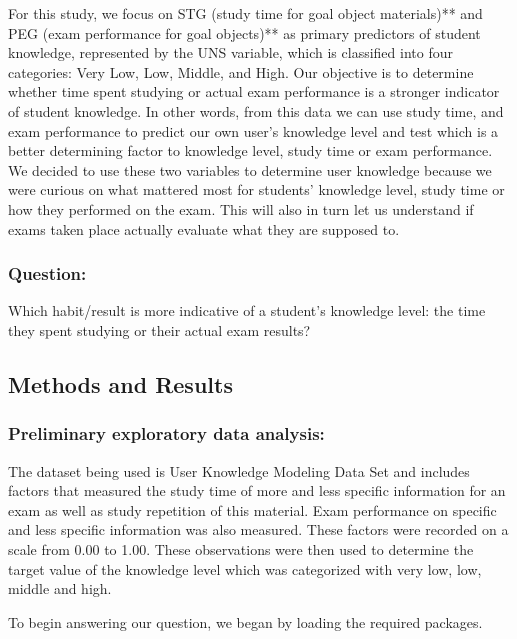 \documentclass[
  letterpaper,
  DIV=11,
  numbers=noendperiod]{scrartcl}
\begin{document}
For this study, we focus on STG (study time for goal object materials)**
and PEG (exam performance for goal objects)** as primary predictors of
student knowledge, represented by the UNS variable, which is classified
into four categories: Very Low, Low, Middle, and High. Our objective is
to determine whether time spent studying or actual exam performance is a
stronger indicator of student knowledge. In other words, from this data
we can use study time, and exam performance to predict our own user's
knowledge level and test which is a better determining factor to
knowledge level, study time or exam performance. We decided to use these
two variables to determine user knowledge because we were curious on
what mattered most for students' knowledge level, study time or how they
performed on the exam. This will also in turn let us understand if exams
taken place actually evaluate what they are supposed to.

\subsubsection{Question:}\label{question}

Which habit/result is more indicative of a student's knowledge level:
the time they spent studying or their actual exam results?

\subsection{\texorpdfstring{\textbf{Methods and
Results}}{Methods and Results}}\label{methods-and-results}

\subsubsection{Preliminary exploratory data
analysis:}\label{preliminary-exploratory-data-analysis}

The dataset being used is User Knowledge Modeling Data Set and includes
factors that measured the study time of more and less specific
information for an exam as well as study repetition of this material.
Exam performance on specific and less specific information was also
measured. These factors were recorded on a scale from 0.00 to 1.00.
These observations were then used to determine the target value of the
knowledge level which was categorized with very low, low, middle and
high.

To begin answering our question, we began by loading the required
packages.
\end{document}
